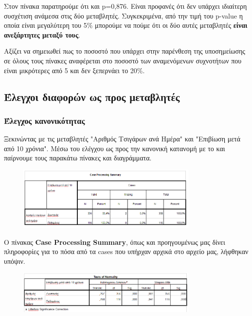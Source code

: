 Στον πίνακα  παρατηρούμε ότι  και p=0,876. Είναι προφανές ότι δεν υπάρχει ιδιαίτερη συσχέτιση ανάμεσα στις δύο μεταβλητές. Συγκεκριμένα, από την τιμή του p-value η οποία είναι μεγαλύτερη του 5\% μπορούμε να πούμε ότι οι δύο αυτές μεταβλητές \textbf{είναι ανεξάρτητες μεταξύ τους}.

Αξίζει να σημειωθεί πως το ποσοστό που υπάρχει στην παρένθεση της υποσημείωσης σε όλους τους πίνακες  αναφέρεται στο ποσοστό των αναμενόμενων συχνοτήτων που είναι μικρότερες από 5 και δεν ξεπερνάει το 20\%.

\subsection{Έλεγχοι διαφορών ως προς μεταβλητές }

\subsubsection{Έλεγχος κανονικότητας}

Ξεκινώντας με τις μεταβλητές "Αριθμός Τσιγάρων ανά Ημέρα" και "Επιβίωση μετά από 10 χρόνια". Μέσω του ελέγχου ως προς την κανονική κατανομή με το  και  παίρνουμε τους παρακάτω πίνακες και διαγράμματα. 

\begin{figure}[h]
    \centering
    \includegraphics[width=0.8\textwidth]{images/109.PNG}
\end{figure}

Ο πίνακας \textbf{Case Processing Summary}, όπως και προηγουμένως μας δίνει πληροφορίες για το πόσα από τα cases που υπήρχαν αρχικά στο αρχείο μας, λήφθηκαν υπόψιν.

\clearpage

\begin{figure}[h]
    \centering
    \includegraphics[width=0.8\textwidth]{images/110.PNG}
\end{figure}

